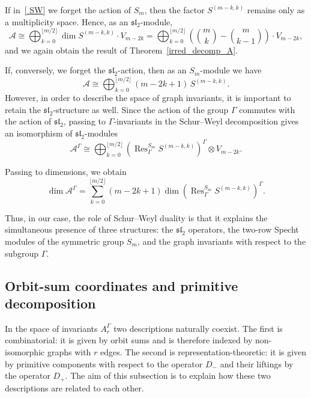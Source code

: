 \documentclass[12pt,reqno]{amsart}
\begin{document}
If in~\eqref{ SW} we forget the action of $S_m$, then the factor
$S^{(m-k,k)}$ remains only as a multiplicity space. Hence, as an
$\mathfrak{sl}_2$-module,
\begin{equation}
  \mathcal A
  \cong
  \bigoplus_{k=0}^{\lfloor m/2 \rfloor}
\dim S^{(m-k,k)}\cdot V_{m-2k}=\bigoplus_{k=0}^{\lfloor m/2 \rfloor}
\left( \binom{m}{k}-\binom{m}{k-1} \right) \cdot V_{m-2k},
\end{equation}
and we again obtain the result of Theorem~\ref{irred_decomp_A}.

If, conversely, we forget the $\mathfrak{sl}_2$-action, then as an
$S_m$-module we have
$$
  \mathcal A
  \cong
  \bigoplus_{k=0}^{\lfloor m/2 \rfloor}
   (m-2k+1)\,S^{(m-k,k)}.
$$
However, in order to describe the space of graph invariants, it is important
to retain the $\mathfrak{sl}_2$-structure as well. Since the action of the
group $\Gamma$ commutes with the action of $\mathfrak{sl}_2$, passing to
$\Gamma$-invariants in the Schur--Weyl decomposition gives an isomorphism of
$\mathfrak{sl}_2$-modules
\begin{equation}\label{ab}
  \mathcal A^\Gamma
  \cong
  \bigoplus_{k=0}^{\lfloor m/2 \rfloor}
  \left(
  \operatorname{Res}^{S_m}_{\Gamma}S^{(m-k,k)}
  \right)^\Gamma
  \otimes V_{m-2k}.
\end{equation}

Passing to dimensions, we obtain
$$
\dim \mathcal A^\Gamma
=
\sum_{k=0}^{\lfloor m/2 \rfloor}
(m-2k+1)
\dim
\left(
\operatorname{Res}^{S_m}_{\Gamma}S^{(m-k,k)}
\right)^\Gamma.
$$

\medskip

Thus, in our case, the role of Schur--Weyl duality is that it explains the
simultaneous presence of three structures: the $\mathfrak{sl}_2$ operators,
the two-row Specht modules of the symmetric group $S_m$, and the graph
invariants with respect to the subgroup $\Gamma$.

\subsection{Orbit-sum coordinates and primitive decomposition}


In the space of invariants $A_r^\Gamma$ two descriptions naturally coexist.
The first is combinatorial: it is given by orbit sums and is therefore indexed
by non-isomorphic graphs with $r$ edges. The second is representation-theoretic:
it is given by primitive components with respect to the operator $D_-$ and
their liftings by the operator $D_+$. The aim of this subsection is to explain
how these two descriptions are related to each other.
\end{document}
